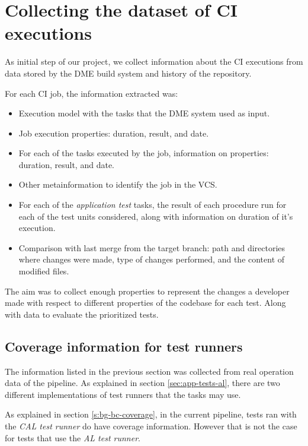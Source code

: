 \section{Collecting the dataset of CI executions}\label{s:method-collecting-dataset}

As initial step of our project, we collect information about the CI executions
from data stored by the DME build system and history of the repository.

For each CI job, the information extracted was:
\begin{itemize}
    \item Execution model with the tasks that the DME system used as input.
    \item Job execution properties: duration, result, and date.
    \item For each of the tasks executed by the job, information on properties: duration, result, and date.
    \item Other metainformation to identify the job in the VCS.
    \item For each of the \emph{application test} tasks, the result of each procedure run for each of the test units considered, along with information on duration of it's execution.
    \item Comparison with last merge from the target branch: path and directories where changes were made, type of changes performed, and the content of modified files.
\end{itemize}

The aim was to collect enough properties to represent the changes a developer made
with respect to different properties of the codebase for each test. Along with data to evaluate 
the prioritized tests.

\subsection{Coverage information for test runners}\label{s:method-collecting-coverage}

The information listed in the previous section was collected from real operation data
of the pipeline. As explained in section \ref{sec:app-tests-al}, there are two different
implementations of test runners that the tasks may use.

As explained in section \ref{s:bg-bc-coverage}, in the current pipeline, tests ran with the \emph{CAL test runner}
do have coverage information. However that is not the case for tests that use the \emph{AL test runner}.

